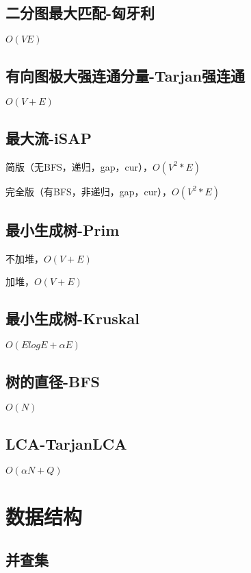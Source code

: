 \documentclass[10pt]{article}
\begin{document}
\subsection{二分图最大匹配-匈牙利}
$O(VE)$


\subsection{有向图极大强连通分量-Tarjan强连通}
$O(V+E)$


\subsection{最大流-iSAP}
简版（无BFS，递归，gap，cur），$O(V^2*E)$

完全版（有BFS，非递归，gap，cur），$O(V^2*E)$


\subsection{最小生成树-Prim}
不加堆，$O(V+E)$

加堆，$O(V+E)$


\subsection{最小生成树-Kruskal}
$O(ElogE+αE)$


\subsection{树的直径-BFS}
$O(N)$


\subsection{LCA-TarjanLCA}
$O(αN+Q)$

\section{数据结构}
\subsection{并查集}

\end{document}
